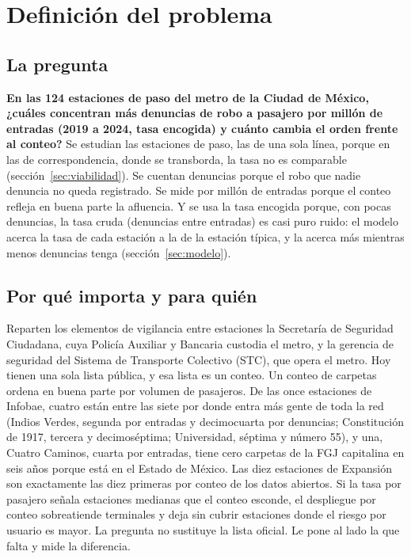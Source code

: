 \documentclass[conference]{IEEEtran}
\begin{document}
\section{Definición del problema}

\subsection{La pregunta}

\textbf{En las 124 estaciones de paso del metro de la Ciudad de México, ¿cuáles concentran más denuncias de robo a pasajero por millón de entradas (2019 a 2024, tasa encogida) y cuánto cambia el orden frente al conteo?} Se estudian las estaciones de paso, las de una sola línea, porque en las de correspondencia, donde se transborda, la tasa no es comparable (sección~\ref{sec:viabilidad}). Se cuentan denuncias porque el robo que nadie denuncia no queda registrado. Se mide por millón de entradas porque el conteo refleja en buena parte la afluencia. Y se usa la tasa encogida porque, con pocas denuncias, la tasa cruda (denuncias entre entradas) es casi puro ruido: el modelo acerca la tasa de cada estación a la de la estación típica, y la acerca más mientras menos denuncias tenga (sección~\ref{sec:modelo}).

\subsection{Por qué importa y para quién}

Reparten los elementos de vigilancia entre estaciones la Secretaría de Seguridad Ciudadana, cuya Policía Auxiliar y Bancaria custodia el metro, y la gerencia de seguridad del Sistema de Transporte Colectivo (STC), que opera el metro. Hoy tienen una sola lista pública, y esa lista es un conteo. Un conteo de carpetas ordena en buena parte por volumen de pasajeros. De las once estaciones de Infobae, cuatro están entre las siete por donde entra más gente de toda la red (Indios Verdes, segunda por entradas y decimocuarta por denuncias; Constitución de 1917, tercera y decimoséptima; Universidad, séptima y número 55), y una, Cuatro Caminos, cuarta por entradas, tiene cero carpetas de la FGJ capitalina en seis años porque está en el Estado de México. Las diez estaciones de Expansión son exactamente las diez primeras por conteo de los datos abiertos. Si la tasa por pasajero señala estaciones medianas que el conteo esconde, el despliegue por conteo sobreatiende terminales y deja sin cubrir estaciones donde el riesgo por usuario es mayor. La pregunta no sustituye la lista oficial. Le pone al lado la que falta y mide la diferencia.
\end{document}
